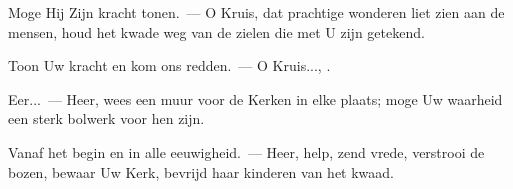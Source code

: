 \documentclass[12pt,twoside,a5paper]{article}
\begin{document}

\begin{halfparskip}
  Moge Hij Zijn kracht tonen.~--- O Kruis, dat prachtige wonderen liet zien aan de mensen, houd het kwade weg van de zielen die met U zijn getekend.

  Toon Uw kracht en kom ons redden.~--- O Kruis..., .

  Eer...~--- Heer, wees een muur voor de Kerken in elke plaats; moge Uw waarheid een sterk bolwerk voor hen zijn.

  Vanaf het begin en in alle eeuwigheid.~--- Heer, help, zend vrede, verstrooi de bozen, bewaar Uw Kerk, bevrijd haar kinderen van het kwaad.
\end{halfparskip}


\end{document}
